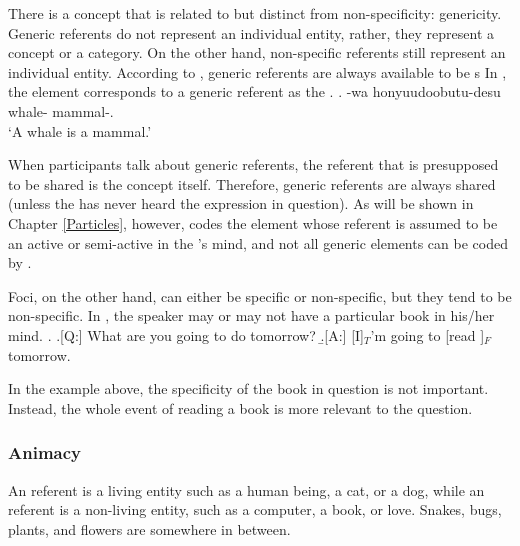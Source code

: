 There is a concept that is related to but distinct from non-specificity: genericity.
Generic referents do not represent an individual entity, rather, they represent a concept or a category.
On the other hand, non-specific referents still represent an individual entity.
According to ,
generic referents are always available to be s
In \Next,
the element  corresponds to a generic referent as the .
%
\exg. -wa honyuudoobutu-desu \\
		whale- mammal-. \\
		`A whale is a mammal.' \hfill{\cite[][p.\ 270]{kuno72}}

When participants talk about generic referents,
the referent that is presupposed to be shared is the concept itself.
Therefore, generic referents are always shared
(unless the  has never heard the expression in question).
As will be shown in Chapter \ref{Particles}, however,
 codes the element whose referent is assumed to be an active or semi-active  in the 's mind, and
not all generic elements can be coded by .


Foci, on the other hand, can either be specific or non-specific,
but they tend to be non-specific.
In \Next[A],
the speaker may or may not have a particular book in his/her mind.
%
\ex. \a.[Q:] What are you going to do tomorrow?
	\b.[A:] [I]$_{T}$'m going to [read ]$_{F}$ tomorrow.

In the example above,
the specificity of the book in question is not important.
Instead, the whole event of reading a book is more relevant to the question.



\subsubsection{Animacy}

An  referent is a living entity such as a human being, a cat, or a dog,
while an  referent is a non-living entity, such as a computer, a book, or love.
Snakes, bugs, plants, and flowers are somewhere in between.

